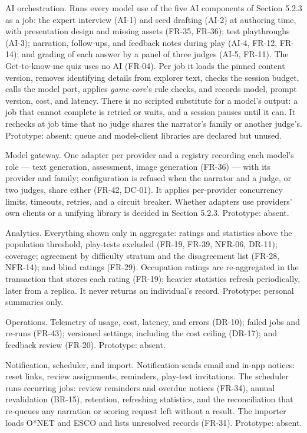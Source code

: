 AI orchestration. Runs every model use of the five AI components of Section 5.2.3 as a job: the expert interview (AI-1) and seed drafting (AI-2) at authoring time, with presentation design and missing assets (FR-35, FR-36); test playthroughs (AI-3); narration, follow-ups, and feedback notes during play (AI-4, FR-12, FR-14); and grading of each answer by a panel of three judges (AI-5, FR-11). The Get-to-know-me quiz uses no AI (FR-04). Per job it loads the pinned content version, removes identifying details from explorer text, checks the session budget, calls the model port, applies \textit{game-core}'s rule checks, and records model, prompt version, cost, and latency. There is no scripted substitute for a model's output: a job that cannot complete is retried or waits, and a session pauses until it can. It rechecks at job time that no judge shares the narrator's family or another judge's. Prototype: absent; queue and model-client libraries are declared but unused.

Model gateway. One adapter per provider and a registry recording each model's role --- text generation, assessment, image generation (FR-36) --- with its provider and family; configuration is refused when the narrator and a judge, or two judges, share either (FR-42, DC-01). It applies per-provider concurrency limits, timeouts, retries, and a circuit breaker. Whether adapters use providers' own clients or a unifying library is decided in Section 5.2.3. Prototype: absent.

Analytics. Everything shown only in aggregate: ratings and statistics above the population threshold, play-tests excluded (FR-19, FR-39, NFR-06, DR-11); coverage; agreement by difficulty stratum and the disagreement list (FR-28, NFR-14); and blind ratings (FR-29). Occupation ratings are re-aggregated in the transaction that stores each rating (FR-19); heavier statistics refresh periodically, later from a replica. It never returns an individual's record. Prototype: personal summaries only.

Operations. Telemetry of usage, cost, latency, and errors (DR-10); failed jobs and re-runs (FR-43); versioned settings, including the cost ceiling (DR-17); and feedback review (FR-20). Prototype: absent.

Notification, scheduler, and import. Notification sends email and in-app notices: reset links, review assignments, reminders, play-test invitations. The scheduler runs recurring jobs: review reminders and overdue notices (FR-34), annual revalidation (BR-15), retention, refreshing statistics, and the reconciliation that re-queues any narration or scoring request left without a result. The importer loads O*NET and ESCO and lists unresolved records (FR-31). Prototype: absent.

